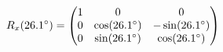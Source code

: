 \documentclass[preview]{standalone}
\begin{document}
\begin{align*}
\special{dvisvgm:raw <g id='unique000'>}R_x(26.1^\circ) = \begin{pmatrix} 1 & 0 & 0 \\ 0 & \cos(26.1^\circ) & -\sin(26.1^\circ) \\ 0 & \sin(26.1^\circ) & \cos(26.1^\circ) \end{pmatrix}\special{dvisvgm:raw </g>}
\end{align*}
\end{document}
